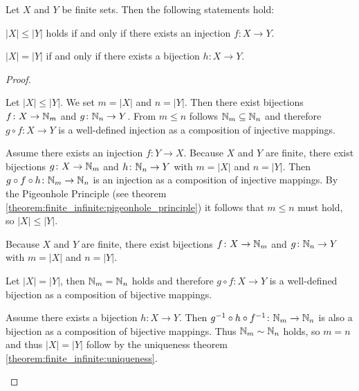 \begin{theorem}\label{theorem:finite_infinite:size_comparison}
    Let $X$ and $Y$ be finite sets. Then the following statements hold:
    \begin{intheoremenumerate}
        \item\label{theorem:finite_infinite:size_comparison:injection} $|X|\leq |Y|$ holds if and only if there exists an injection $f\colon X\to Y$.
        \item\label{theorem:finite_infinite:size_comparison:bijection} $|X|=|Y|$ if and only if there exists a bijection $h\colon X\to Y$.
    \end{intheoremenumerate} 
\end{theorem}
\begin{proof}
    \begin{proofenumerate}
        \item \proofright Let $|X|\leq |Y|$. We set $m=|X|$ and $n=|Y|$. Then there exist bijections $f\colon X\to\mathbb{N}_m$ and $g\colon \mathbb{N}_n\to Y$. From $m\leq n$ follows $\mathbb{N}_m\subseteq\mathbb{N}_n$ and therefore $g\circ f\colon X\to Y$ is a well-defined injection as a composition of injective mappings.

        \proofleft Assume there exists an injection $f\colon Y\to X$. Because $X$ and $Y$ are finite, there exist bijections $g\colon X\to \mathbb{N}_m$ and $h\colon \mathbb{N}_n\to Y$ with $m=|X|$ and $n=|Y|$. Then $g\circ f\circ h\colon\mathbb{N}_m\to\mathbb{N}_n$ is an injection as a composition of injective mappings. By the Pigeonhole Principle (see theorem \ref{theorem:finite_infinite:pigeonhole_principle}) it follows that $m\leq n$ must hold, so $|X|\leq |Y|$.

        \item Because $X$ and $Y$ are finite, there exist bijections $f\colon X\to\mathbb{N}_m$ and $g\colon \mathbb{N}_n\to Y$ with $m=|X|$ and $n=|Y|$.
        
        \proofright Let $|X|=|Y|$, then $\mathbb{N}_m=\mathbb{N}_n$ holds and therefore $g\circ f\colon X\to Y$ is a well-defined bijection as a composition of bijective mappings.
        
        \proofleft Assume there exists a bijection $h\colon X\to Y$. Then $g^{-1}\circ h\circ f^{-1}\colon\mathbb{N}_m\to\mathbb{N}_n$ is also a bijection as a composition of bijective mappings. Thus $\mathbb{N}_m\sim\mathbb{N}_n$ holds, so $m=n$ and thus $|X|=|Y|$ follow by the uniqueness theorem \ref{theorem:finite_infinite:uniqueness}.
    \end{proofenumerate}
\end{proof}

